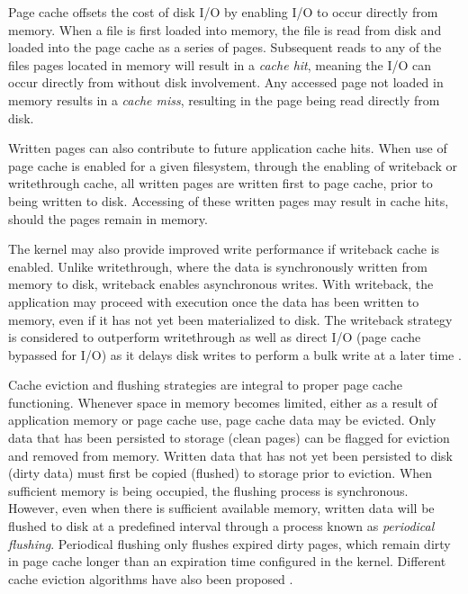 \documentclass[conference]{IEEEtran}
\begin{document}
        Page cache offsets the cost of disk I/O by enabling I/O to occur directly from memory.
        When a file is first loaded into memory, the file is read from disk and loaded into the page cache as
        a series of pages. Subsequent reads to any of the files pages located in memory will result in
        a \textit{cache hit}, meaning the I/O can occur directly from without disk involvement.
        Any accessed page not loaded in memory results in a \textit{cache miss}, resulting in
        the page being read directly from disk.
        
        Written pages can also contribute to future application cache hits. When use of page cache
        is enabled for a given filesystem, through the enabling of writeback or writethrough cache,
        all written pages are written first to page cache, prior to being written to disk.
        Accessing of these written pages may result in cache hits, should the pages remain in memory.

        The kernel may also provide improved write performance if writeback cache is enabled. Unlike writethrough,
        where the data is synchronously written from memory to disk, writeback enables asynchronous writes.
        With writeback, the application may proceed with execution once the data has been
        written to memory, even if it has not yet been materialized to disk.  
        The writeback strategy is considered to outperform writethrough as well as
        direct I/O (page cache bypassed for I/O) as it delays disk writes to perform a bulk write at a later time
        \cite{linuxdev3rd2010}.

        Cache eviction and flushing strategies are integral to proper page cache functioning.
        Whenever space in memory becomes limited, either as a result of application memory
        or page cache use, page cache data may be evicted. Only data that
        has been persisted to storage (clean pages) can be flagged for eviction and removed from
        memory. Written data that has not yet been persisted to disk (dirty data) must first
        be copied (flushed) to storage prior to eviction. When sufficient memory is
        being occupied, the flushing process is synchronous. However, even when
        there is sufficient available memory, written data will be flushed to disk
        at a predefined interval through a process known as \textit{periodical flushing}.
        Periodical flushing only flushes expired dirty pages, which remain dirty in
        page cache longer than an expiration time configured in the kernel.
        Different cache eviction algorithms have also been proposed
        \cite{owda2014comparison}.
\end{document}
